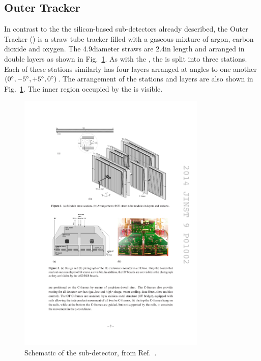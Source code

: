 \subsection{Outer Tracker}

In contrast to the the silicon-based sub-detectors already described, the Outer Tracker (\ot) is a straw tube tracker filled with a gaseous mixture of argon, carbon dioxide and oxygen. The 4.9\mm diameter straws are 2.4\m in length and arranged in double layers as shown in Fig.~\ref{fig:Dec_ot_schematic}. As with the \intr, the \ot is split into three stations. Each of these stations similarly has four layers arranged at angles to one another $(0^{\circ},-5^{\circ},+5^{\circ},0^{\circ})$. The arrangement of the stations and layers are also shown in Fig.~\ref{fig:Dec_ot_schematic}. The inner region occupied by the \intr is visible.

\begin{figure}[!h]
    \centering
    \includegraphics[width=0.8\textwidth]{figs/Detector/ot_layout.pdf}
    \caption{Schematic of the \ot sub-detector, from Ref.~\cite{LHCb-DP-2013-003}.}
    \label{fig:Dec_ot_schematic}   
\end{figure}
 
